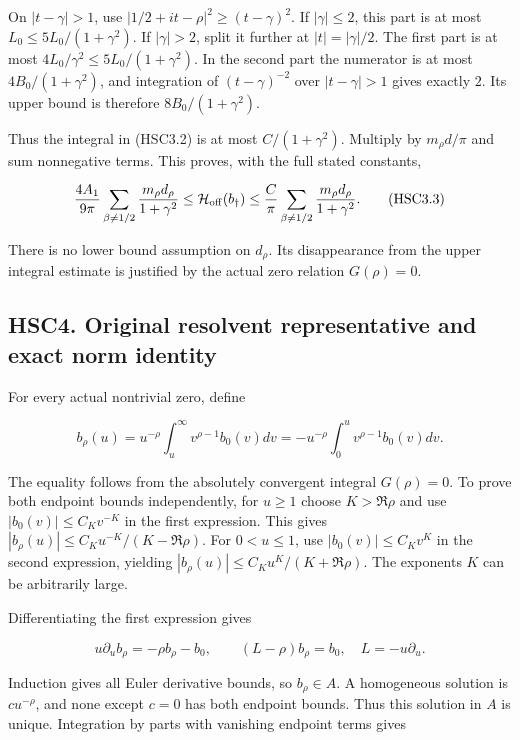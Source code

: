 On \(|t-\gamma|>1\), use \(|1/2+it-\rho|^2\ge(t-\gamma)^2\). If
\(|\gamma|\le2\), this part is at most \(L_0\le5L_0/(1+\gamma^2)\). If
\(|\gamma|>2\), split it further at \(|t|=|\gamma|/2\). The first part
is at most \(4L_0/\gamma^2\le5L_0/(1+\gamma^2)\). In the second part the
numerator is at most \(4B_0/(1+\gamma^2)\), and integration of
\((t-\gamma)^{-2}\) over \(|t-\gamma|>1\) gives exactly \(2\). Its upper
bound is therefore \(8B_0/(1+\gamma^2)\).

Thus the integral in (HSC3.2) is at most \(C/(1+\gamma^2)\). Multiply by
\(m_\rho d/\pi\) and sum nonnegative terms. This proves, with the full
stated constants,

\[
 \frac{4A_1}{9\pi}\sum_{\beta\ne1/2}
 \frac{m_\rho d_\rho}{1+\gamma^2}
 \le \mathcal H_{\rm off}(b_\dagger)
 \le\frac C\pi\sum_{\beta\ne1/2}
 \frac{m_\rho d_\rho}{1+\gamma^2}.
\tag{HSC3.3}
\]

There is no lower bound assumption on \(d_\rho\). Its disappearance from
the upper integral estimate is justified by the actual zero relation
\(G(\rho)=0\).

\subsection{HSC4. Original resolvent representative and exact norm
identity}\label{hsc4.-original-resolvent-representative-and-exact-norm-identity}

For every actual nontrivial zero, define

\[
 b_\rho(u)=u^{-\rho}\int_u^\infty v^{\rho-1}b_0(v)dv
 =-u^{-\rho}\int_0^u v^{\rho-1}b_0(v)dv.
\tag{HSC4.1}
\]

The equality follows from the absolutely convergent integral
\(G(\rho)=0\). To prove both endpoint bounds independently, for
\(u\ge1\) choose \(K>\Re\rho\) and use \(|b_0(v)|\le C_Kv^{-K}\) in the
first expression. This gives \(|b_\rho(u)|\le C_Ku^{-K}/(K-\Re\rho)\).
For \(0<u\le1\), use \(|b_0(v)|\le C_Kv^K\) in the second expression,
yielding \(|b_\rho(u)|\le C_Ku^K/(K+\Re\rho)\). The exponents \(K\) can
be arbitrarily large.

Differentiating the first expression gives

\[
 u\partial_u b_\rho=-\rho b_\rho-b_0,\qquad
 (L-\rho)b_\rho=b_0,\quad L=-u\partial_u.
\tag{HSC4.2}
\]

Induction gives all Euler derivative bounds, so \(b_\rho\in A\). A
homogeneous solution is \(c u^{-\rho}\), and none except \(c=0\) has
both endpoint bounds. Thus this solution in \(A\) is unique. Integration
by parts with vanishing endpoint terms gives

